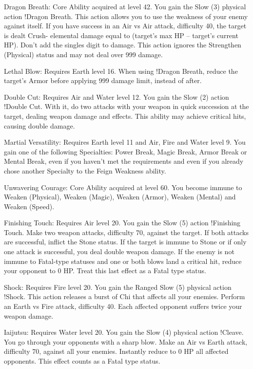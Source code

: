 \begin{ffminipage}
  Dragon Breath: Core Ability acquired at level 42. You gain the Slow (3) physical action !Dragon Breath. This action allows you to use the weakness of your enemy against itself. If you have success in an Air vs Air attack, difficulty 40, the target is dealt Crush- elemental damage equal to (target’s max HP – target’s current HP). Don’t add the singles digit to damage. This action ignores the Strengthen (Physical) status and may not deal over 999 damage.

  \begin{jobchoice}
    Lethal Blow: Requires Earth level 16. When using !Dragon Breath, reduce the target's Armor before applying 999 damage limit, instead of after.

    Double Cut: Requires Air and Water level 12. You gain the Slow (2) action !Double Cut. With it, do two attacks with your weapon in quick succession at the target, dealing weapon damage and effects. This ability may achieve critical hits, causing double damage.

    Martial Versatility: Requires Earth level 11 and Air, Fire and Water level 9. You gain one of the following Specialties: Power Break, Magic Break, Armor Break or Mental Break, even if you haven’t met the requirements and even if you already chose another Specialty to the Feign Weakness ability.
  \end{jobchoice}
\end{ffminipage}

\begin{ffminipage}
  Unwavering Courage: Core Ability acquired at level 60. You become immune to Weaken (Physical), Weaken (Magic), Weaken (Armor), Weaken (Mental) and Weaken (Speed).

  \begin{jobchoice}
    Finishing Touch: Requires Air level 20. You gain the Slow (5) action !Finishing Touch. Make two weapon attacks, difficulty 70, against the target. If both attacks are successful, inflict the Stone status. If the target is immune to Stone or if only one attack is successful, you deal double weapon damage. If the enemy is not immune to Fatal-type statuses and one or both blows land a critical hit, reduce your opponent to 0 HP. Treat this last effect as a Fatal type status.

    Shock: Requires Fire level 20. You gain the Ranged Slow (5) physical action !Shock. This action releases a burst of Chi that affects all your enemies. Perform an Earth vs Fire attack, difficulty 40. Each affected opponent suffers twice your weapon damage.

    Iaijutsu: Requires Water level 20. You gain the Slow (4) physical action !Cleave. You go through your opponents with a sharp blow. Make an Air vs Earth attack, difficulty 70, against all your enemies. Instantly reduce to 0 HP all affected opponents. This effect counts as a Fatal type status.
  \end{jobchoice}
\end{ffminipage}